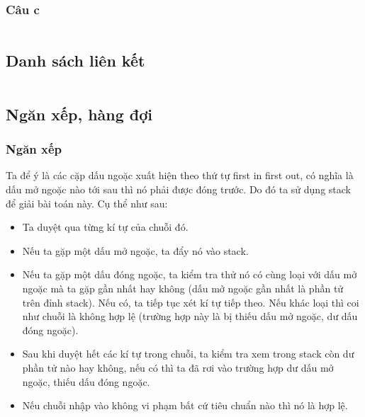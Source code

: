 \documentclass[main.tex]{subfiles}
\begin{document}
\subsubsection{Câu c}
\inputminted[linenos]{cpp}{answer_sources/ConTroNC_c.cpp}


\subsection{Danh sách liên kết}
\inputminted[linenos]{cpp}{answer_sources/DanhSachLK.cpp}


\subsection{Ngăn xếp, hàng đợi}
\subsubsection{Ngăn xếp}
Ta để ý là các cặp dấu ngoặc xuất hiện theo thứ tự 
first in first out, có nghĩa là dấu mở ngoặc nào tới sau thì nó phải được đóng trước. Do đó ta sử dụng stack để giải bài toán này. Cụ thể như sau:
\begin{itemize}
    \item Ta duyệt qua từng kí tự của chuỗi đó.
    \item Nếu ta gặp một dấu mở ngoặc, ta đẩy nó vào stack.
    \item Nếu ta gặp một dấu đóng ngoặc, ta kiểm tra thử nó có cùng loại với dấu mở ngoặc mà ta gặp gần nhất hay không (dấu mở ngoặc gần nhất là phần tử trên đỉnh stack). Nếu có, ta tiếp tục xét kí tự tiếp theo. Nếu khác loại thì coi như chuỗi là không hợp lệ (trường hợp này là bị thiếu dấu mở ngoặc, dư dấu đóng ngoặc).
    \item Sau khi duyệt hết các kí tự trong chuỗi, ta kiểm tra xem trong stack còn dư phần tử nào hay không, nếu có thì ta đã rơi vào trường hợp dư dấu mở ngoặc, thiếu dấu đóng ngoặc.
    \item Nếu chuỗi nhập vào không vi phạm bất cứ tiêu chuẩn nào thì nó là hợp lệ.
\end{itemize}

\inputminted[linenos]{cpp}{answer_sources/Stack.cpp}


\end{document}
